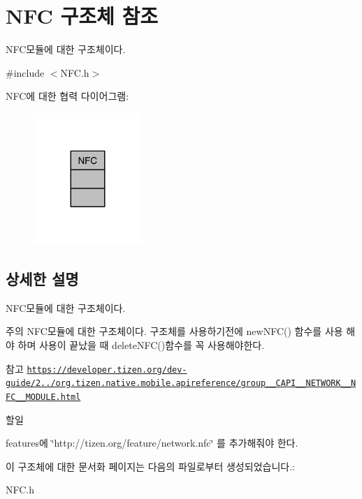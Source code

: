 \hypertarget{struct_n_f_c}{\section{N\-F\-C 구조체 참조}
\label{struct_n_f_c}
}


N\-F\-C모듈에 대한 구조체이다.  




{\ttfamily \#include $<$N\-F\-C.\-h$>$}



N\-F\-C에 대한 협력 다이어그램\-:\nopagebreak
\begin{figure}[H]
\begin{center}
\leavevmode
\includegraphics[width=116pt]{struct_n_f_c__coll__graph}
\end{center}
\end{figure}


\subsection{상세한 설명}
N\-F\-C모듈에 대한 구조체이다. 

\begin{DoxyNote}{주의}
N\-F\-C모듈에 대한 구조체이다. 구조체를 사용하기전에 new\-N\-F\-C() 함수를 사용 해야 하며 사용이 끝났을 때 delete\-N\-F\-C()함수를 꼭 사용해야한다. 
\end{DoxyNote}
\begin{DoxySeeAlso}{참고}
\href{https://developer.tizen.org/dev-guide/2.3.0/org.tizen.native.mobile.apireference/group__CAPI__NETWORK__NFC__MODULE.html}{\tt https\-://developer.\-tizen.\-org/dev-\/guide/2../org.\-tizen.\-native.\-mobile.\-apireference/group\-\_\-\-\_\-\-C\-A\-P\-I\-\_\-\-\_\-\-N\-E\-T\-W\-O\-R\-K\-\_\-\-\_\-\-N\-F\-C\-\_\-\-\_\-\-M\-O\-D\-U\-L\-E.\-html} 
\end{DoxySeeAlso}
\begin{DoxyRefDesc}{할일}
\item[\hyperlink{todo__todo000001}{할일}]features에 \char`\"{}http\-://tizen.\-org/feature/network.\-nfc\char`\"{} 를 추가해줘야 한다. \end{DoxyRefDesc}


이 구조체에 대한 문서화 페이지는 다음의 파일로부터 생성되었습니다.\-:\begin{DoxyCompactItemize}
\item 
N\-F\-C.\-h\end{DoxyCompactItemize}
